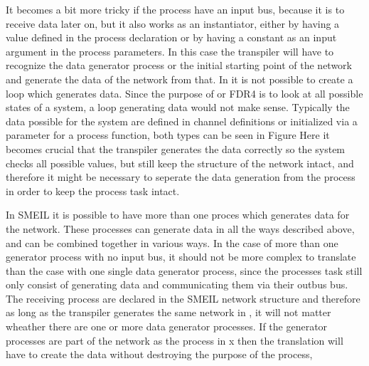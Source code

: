 It becomes a bit more tricky if the process have an input bus, because it is to receive data later on, but it also works as an instantiator, either by having a value defined in the process declaration %
or by having a constant as an input argument in the process parameters. In this case the transpiler will have to recognize the data generator process or the initial starting point of the network and generate the data of the network from that. %
In \cspm it is not possible to create a loop which generates data. Since the purpose of \cspm or FDR4 is to look at all possible states of a system, a loop generating data would not make sense. Typically the data possible for the system are defined in channel definitions or initialized via a parameter for a process function, both types can be seen in Figure %
Here it becomes crucial that the transpiler generates the data correctly so the system checks all possible values, but still keep the structure of the network intact, and therefore it might be necessary to seperate the data generation from the process in order to keep the process task intact.

In SMEIL it is possible to have more than one proces which generates data for the network. These processes can generate data in all the ways described above, and can be combined together in various ways. In the case of more than one generator process with no input bus, it should not be more complex to translate than the case with one single data generator process, since the processes task still only consist of generating data and communicating them via their outbus bus. The receiving process are declared in the SMEIL network structure and therefore as long as the transpiler generates the same network in \cspm, it will not matter wheather there are one or more data generator processes.
If the generator processes are part of the network as the process in x%
then the translation will have to create the data without destroying the purpose of the process, %




